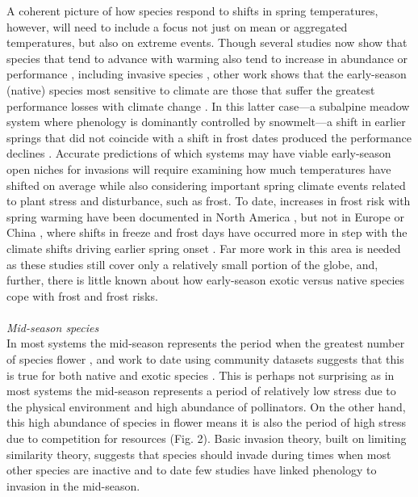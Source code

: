 \documentclass[11pt,a4paper,oneside]{article}
\begin{document}
A coherent picture of how species respond to shifts in spring temperatures, however, will need to include a focus not just on mean or aggregated temperatures, but also on extreme events. Though several studies now show that species that tend to advance with warming also tend to increase in abundance or performance \citep{Cleland:2012vn}, including invasive species \citep{Willis:2010al,chuine2013}, other work shows that the early-season (native) species most sensitive  to climate are those that suffer the greatest performance losses with climate change \citep{Inouye:2008gj}. In this latter case---a subalpine meadow system where phenology is dominantly controlled by snowmelt---a shift in earlier springs that did not coincide with a shift in frost dates produced the performance declines \citep{Inouye:2008gj}. Accurate predictions of which systems may have viable early-season open niches for invasions will require examining how much temperatures have shifted on average while also considering important spring climate events related to plant stress and disturbance, such as frost. To date, increases in frost risk with spring warming have been documented in North America \citep{Inouye:2008gj,Augspurger2013}, but not in Europe \citep{Menzel2003a,Scheifinger2003} or China \citep{Dai2013}, where shifts in freeze and frost days have occurred more in step with the climate shifts driving earlier spring onset \citep{Dai2013}. Far more work in this area is needed as these studies still cover only a relatively small portion of the globe, and, further, there is little known about how early-season exotic versus native species cope with frost and frost risks.\\
\\
\noindent \emph{Mid-season species}\\
In most systems the mid-season represents the period when the greatest number of species flower \citep[e.g.,][]{Fitter:2002sm,Morales:2005ex,Miller-Rushing:2008zv,Aldridge:2011}, and work to date using community datasets suggests that this is true for both native and exotic species \citep{wolkovichAmBot2013}. This is perhaps not surprising as in most systems the mid-season represents a period of relatively low stress due to the physical environment and high abundance of pollinators. On the other hand, this high abundance of species in flower means it is also the period of high stress due to competition for resources (Fig. 2). Basic invasion theory, built on limiting similarity theory, suggests that species should invade during times when most other species are inactive \citep[vacant phenological niche, see][]{wolkovich:2010fee} and to date few studies have linked phenology to invasion in the mid-season.\\
\end{document}
